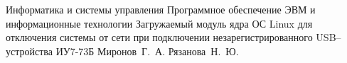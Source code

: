 \documentclass{bmstu}
\begin{document}
\makecourseworktitle
{Информатика и системы управления}
{Программное обеспечение ЭВМ и информационные технологии}
{Загружаемый модуль ядра ОС Linux для отключения системы от сети при подключении незарегистрированного USB--устройства}
{ИУ7-73Б}
{Миронов~Г.~А.}
{Рязанова~Н.~Ю.}
{}
{}
\setcounter{page}{3}

%
    
\maketableofcontents








\makebibliography


\end{document}
